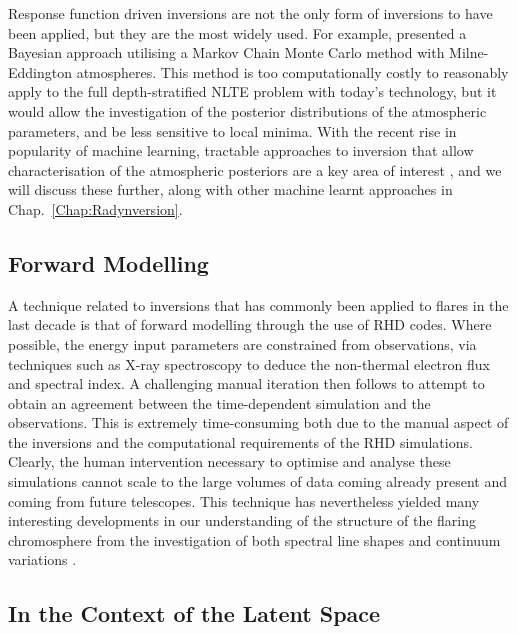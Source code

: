Response function driven inversions are not the only form of inversions to have been applied, but they are the most widely used.
For example, \citet{AsensioRamos2007} presented a Bayesian approach utilising a Markov Chain Monte Carlo method with Milne-Eddington atmospheres.
This method is too computationally costly to reasonably apply to the full depth-stratified NLTE problem with today's technology, but it would allow the investigation of the posterior distributions of the atmospheric parameters, and be less sensitive to local minima.
With the recent rise in popularity of machine learning, tractable approaches to inversion that allow characterisation of the atmospheric posteriors are a key area of interest \citep[e.g.][]{Osborne2019, DiazBaso2021}, and we will discuss these further, along with other machine learnt approaches in Chap.~\ref{Chap:Radynversion}.


\subsection{Forward Modelling}

A technique related to inversions that has commonly been applied to flares in the last decade is that of forward modelling through the use of RHD codes.
Where possible, the energy input parameters are constrained from observations, via techniques such as X-ray spectroscopy to deduce the non-thermal electron flux and spectral index.
A challenging manual iteration then follows to attempt to obtain an agreement between the time-dependent simulation and the observations.
This is extremely time-consuming both due to the manual aspect of the inversions and the computational requirements of the RHD simulations.
Clearly, the human intervention necessary to optimise and analyse these simulations cannot scale to the large volumes of data coming already present and coming from future telescopes.
This technique has nevertheless yielded many interesting developments in our understanding of the structure of the flaring chromosphere from the investigation of both spectral line shapes and continuum variations \citep{Kuridze2015,RubioDaCosta2016, Kowalski2017,Simoes2017}.

\subsection{In the Context of the Latent Space}

